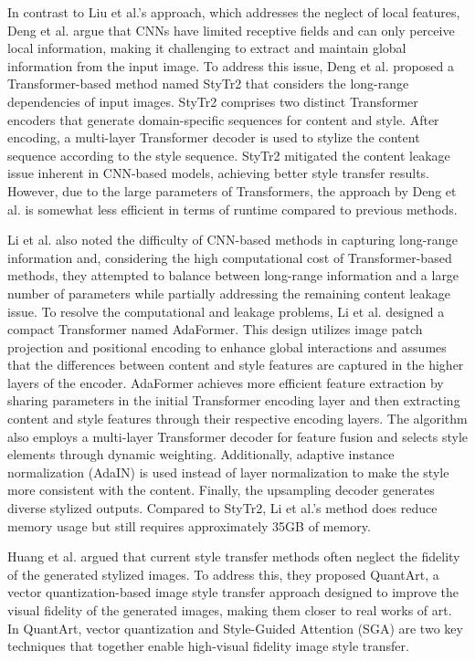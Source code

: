 \documentclass[preprint,12pt]{elsarticle}
\begin{document}
In contrast to Liu et al.’s approach, which addresses the neglect of local features, Deng et al.\citep{49deng2022stytr2} argue that CNNs have limited receptive fields and can only perceive local information, making it challenging to extract and maintain global information from the input image. To address this issue, Deng et al.\citep{49deng2022stytr2} proposed a Transformer-based method named StyTr2 that considers the long-range dependencies of input images. StyTr2 comprises two distinct Transformer encoders that generate domain-specific sequences for content and style. After encoding, a multi-layer Transformer decoder is used to stylize the content sequence according to the style sequence. StyTr2 mitigated the content leakage issue inherent in CNN-based models, achieving better style transfer results. However, due to the large parameters of Transformers, the approach by Deng et al.\citep{49deng2022stytr2} is somewhat less efficient in terms of runtime compared to previous methods.

Li et al.\citep{50li2023compact} also noted the difficulty of CNN-based methods in capturing long-range information and, considering the high computational cost of Transformer-based methods, they attempted to balance between long-range information and a large number of parameters while partially addressing the remaining content leakage issue. To resolve the computational and leakage problems, Li et al. designed a compact Transformer named AdaFormer. This design utilizes image patch projection and positional encoding to enhance global interactions and assumes that the differences between content and style features are captured in the higher layers of the encoder. AdaFormer achieves more efficient feature extraction by sharing parameters in the initial Transformer encoding layer and then extracting content and style features through their respective encoding layers. The algorithm also employs a multi-layer Transformer decoder for feature fusion and selects style elements through dynamic weighting. Additionally, adaptive instance normalization (AdaIN)\citep{04huang2017arbitrary} is used instead of layer normalization to make the style more consistent with the content. Finally, the upsampling decoder generates diverse stylized outputs. Compared to StyTr2\citep{48liu2021adaattn}, Li et al.’s method does reduce memory usage but still requires approximately 35GB of memory\citep{50li2023compact}.

Huang et al.\citep{112huang2023quantart} argued that current style transfer methods often neglect the fidelity of the generated stylized images. To address this, they proposed QuantArt, a vector quantization-based image style transfer approach designed to improve the visual fidelity of the generated images, making them closer to real works of art. In QuantArt, vector quantization and Style-Guided Attention (SGA) are two key techniques that together enable high-visual fidelity image style transfer.
\end{document}
